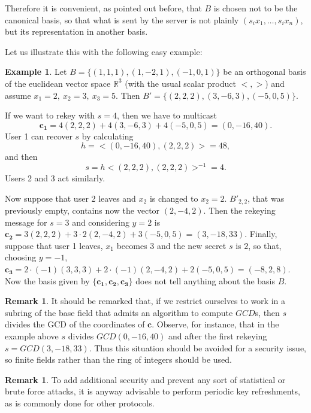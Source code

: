 \documentclass[a4paper,11pt]{amsart}
\theoremstyle{definition}
\newtheorem{remark}[theorem]{Remark}
\newtheorem{example}[theorem]{Example}
\begin{document}
Therefore it is convenient, as pointed out before, that $B$ is chosen
not to be the canonical
basis, so that what is sent by the server is not plainly $(s_ix_1,\dots
,s_ix_n)$, but its representation in another basis.


Let us illustrate this with the following easy example:

\medskip

\begin{example}
  Let $B= \{ (1,1,1),(1,-2,1),(-1,0,1) \}$ be an orthogonal basis of
  the euclidean vector space $\mathbb{R}^3$ (with the usual scalar
  product $<,>$) and assume $x_1=2,\ x_2=3, \ x_3=5$. Then $B'=\{
  (2,2,2), (3,-6,3),(-5,0,5) \}$.

  If we want to rekey with $s=4$, then we have to multicast
$$
\mathbf{c_1} =4(2,2,2)+4(3,-6,3)+4(-5,0,5)=(0,-16,40).
$$
User 1 can recover $s$ by calculating
$$
h=<(0,-16,40),(2,2,2)>=48,
$$
and then
$$
s=h<(2,2,2),(2,2,2)>^{-1}=4.
$$ 
Users 2 and 3 act similarly.

Now suppose that user 2 leaves and $x_2$ is changed to $x_2=2$. $B'_{2,2}$, that was previously empty, contains now the vector $(2,-4,2)$.  Then
the rekeying message for $s=3$ and considering $y=2$ is $\mathbf{c_2}
=3(2,2,2)+3\cdot 2(2,-4,2)+3(-5,0,5)=(3,-18,33)$. Finally, suppose that user 1 leaves, $x_1$ becomes $3$ and the new
secret $s$ is $2$, so that, choosing $y=-1$, $\mathbf{c_3}
=2\cdot (-1)(3,3,3)+2\cdot (-1)(2,-4,2)+2(-5,0,5)=(-8,2,8)$. Now the basis given by $\{
\mathbf{c_1} ,\mathbf{c_2} ,\mathbf{c_3} \}$ does not tell anything
about the basis $B$.
\end{example}



\begin{remark}
  It should be remarked that, if
  we restrict ourselves to work in a subring of the base field that
  admits an algorithm to compute $GCD$s, then $s$ divides the GCD of
  the coordinates of $\mathbf{c} $. Observe, for instance, that in the example above $s$ divides
  $GCD(0,-16,40)$ and after the first rekeying $s=GCD(3,-18,33)$. Thus
  this situation should be avoided for a security issue, so finite fields
  rather than the ring of integers should be
  used. \end{remark}

\begin{remark}
  To add additional security and prevent any sort of statistical or
  brute force attacks, it is anyway advisable to perform periodic key
  refreshments, as is commonly done for other
  protocols. \end{remark}
\end{document}
